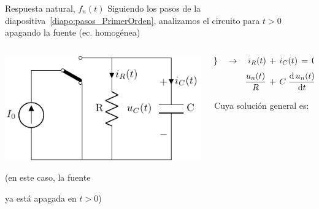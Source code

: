 \documentclass[aspectratio=169, usenames,svgnames,dvipsnames]{beamer}
\begin{document}

\begin{frame}{Respuesta natural, \hspace{3mm}$f_n(t)$}
     \vspace{3mm}
    Siguiendo los pasos de la diapositiva~\ref{diapo:pasos_PrimerOrden}, analizamos el circuito para $t>0$ \alert{apagando la fuente} (ec. homogénea)

    \vspace{-10mm}
    
    \begin{columns}
    \begin{column}{0.45\columnwidth}

        \vspace{9mm}
        \begin{center}
            \includegraphics[height=0.42\textheight]{../figs/transitorio_circuitoRC_t0+.pdf}
        \end{center}
        
        \begin{center}
            {\small(en este caso, la fuente 
            
            ya está apagada en $t>0$)}
        \end{center}
    \end{column}
    \begin{column}{0.55\columnwidth}
        \vspace{5mm}
        \begin{align*}
          \hspace*{-20mm} \textrm{\alert{1LK}} \quad\rightarrow\quad i_R(t) \,&+\, i_C(t) \,=\, 0 \\[3pt]
          \hspace*{5mm} \frac{u_n(t)}{R} \,&+\, C \;\diff{\, u_n(t)}{t} \,=\, 0
        \end{align*}

        \vspace{1mm}
        Cuya \alert{solución general} es:


\end{column}
\end{columns}
\end{frame}
\end{document}
